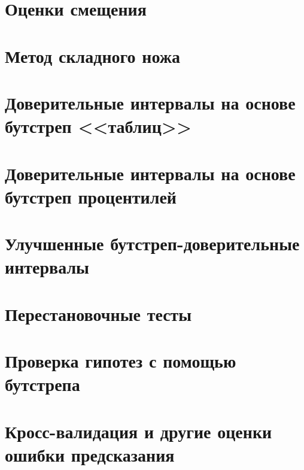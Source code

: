 \documentclass[12pt,a4paper,final]{report}
\begin{document}
\setcounter{chapter}{9}
\chapter{Оценки смещения}







\chapter{Метод складного ножа}








\chapter{Доверительные интервалы на основе бутстреп <<таблиц>>}








\chapter{Доверительные интервалы на основе бутстреп процентилей}










\setcounter{chapter}{13}
\chapter{Улучшенные бутстреп-доверительные интервалы}






\chapter{Перестановочные тесты}






\chapter{Проверка гипотез с помощью бутстрепа}







\chapter{Кросс-валидация и другие оценки ошибки предсказания}








\end{document}
